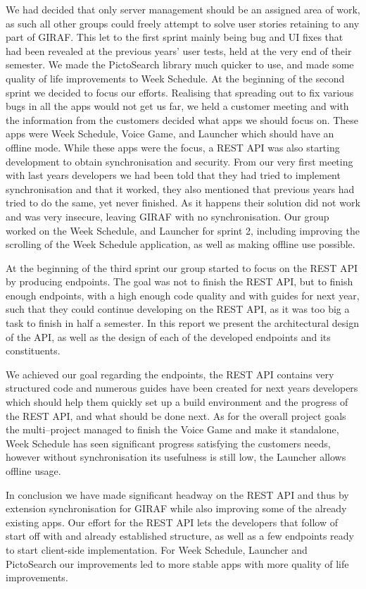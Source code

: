 \bigskip
We had decided that only server management should be an assigned area of work, as such all other groups could freely attempt to solve user stories retaining to any part of GIRAF.
This let to the first sprint mainly being bug and UI fixes that had been revealed at the previous years' user tests, held at the very end of their semester.
We made the PictoSearch library much quicker to use, and made some quality of life improvements to Week Schedule.
At the beginning of the second sprint we decided to focus our efforts.
Realising that spreading out to fix various bugs in all the apps would not get us far, we held a customer meeting and with the information from the customers decided what apps we should focus on.
These apps were Week Schedule, Voice Game, and Launcher which should have an offline mode.
While these apps were the focus, a REST API was also starting development to obtain synchronisation and security.
From our very first meeting with last years developers we had been told that they had tried to implement synchronisation and that it worked, they also mentioned that previous years had tried to do the same, yet never finished.
As it happens their solution did not work and was very insecure, leaving GIRAF with no synchronisation.
Our group worked on the Week Schedule, and Launcher for sprint 2, including improving the scrolling of the Week Schedule application, as well as making offline use possible.

\bigskip
At the beginning of the third sprint our group started to focus on the REST API by producing endpoints.
The goal was not to finish the REST API, but to finish enough endpoints, with a high enough code quality and with guides for next year, such that they could continue developing on the REST API, as it was too big a task to finish in half a semester.
In this report we present the architectural design of the API, as well as the design of each of the developed endpoints and its constituents.

We achieved our goal regarding the endpoints, the REST API contains very structured code and numerous guides have been created for next years developers which should help them quickly set up a build environment and the progress of the REST API, and what should be done next.
As for the overall project goals the multi--project managed to finish the Voice Game and make it standalone, Week Schedule has seen significant progress satisfying the customers needs, however without synchronisation its usefulness is still low, the Launcher allows offline usage.

In conclusion we have made significant headway on the REST API and thus by extension synchronisation for GIRAF while also improving some of the already existing apps.
Our effort for the REST API lets the developers that follow of start off with and already established structure, as well as a few endpoints ready to start client-side implementation.
For Week Schedule, Launcher and PictoSearch our improvements led to more stable apps with more quality of life improvements.
